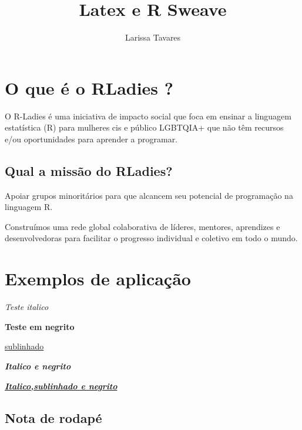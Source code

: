 \documentclass[12pt,a4paper]{article}
\title{Latex e R Sweave} %
\author{Larissa Tavares} %
\begin{document}


\maketitle %

\tableofcontents %
\listoffigures %
\listoftables %


\section{O que é o RLadies ?} %

O R-Ladies é uma iniciativa de impacto social que foca em ensinar a linguagem estatística (R) para mulheres cis e público LGBTQIA+ que não têm recursos e/ou oportunidades para aprender a programar.

\subsection{Qual a missão do RLadies?}

Apoiar grupos minoritários para que alcancem seu potencial de programação na linguagem R.

Construímos uma rede global colaborativa de líderes, mentores, aprendizes e desenvolvedoras para facilitar o progresso individual e coletivo em todo o mundo.

\section{Exemplos de aplicação}

\textit{Teste italico}

\textbf{Teste em negrito}

\underline{sublinhado}

\textit{\textbf{Italico e negrito}}

\textit{\textbf{\underline{Italico,sublinhado e negrito}}}

\newpage

\subsection{Nota de rodapé}
\end{document}
